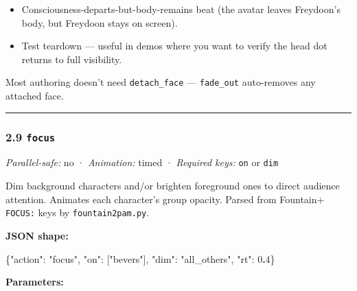 \documentclass[
  12pt,
  letterpaper,
]{book}
\newenvironment{Shaded}{}{}
\newcommand{\DataTypeTok}[1]{\textcolor[rgb]{0.56,0.13,0.00}{#1}}
\newcommand{\DecValTok}[1]{\textcolor[rgb]{0.25,0.63,0.44}{#1}}
\newcommand{\ErrorTok}[1]{\textcolor[rgb]{1.00,0.00,0.00}{\textbf{#1}}}
\newcommand{\FunctionTok}[1]{\textcolor[rgb]{0.02,0.16,0.49}{#1}}
\newcommand{\OtherTok}[1]{\textcolor[rgb]{0.00,0.44,0.13}{#1}}
\newcommand{\StringTok}[1]{\textcolor[rgb]{0.25,0.44,0.63}{#1}}
\providecommand{\tightlist}{%
  \setlength{\itemsep}{0pt}\setlength{\parskip}{0pt}}
\begin{document}
\begin{itemize}
\tightlist
\item
  Consciousness-departs-but-body-remains beat (the avatar leaves
  Freydoon's body, but Freydoon stays on screen).
\item
  Test teardown --- useful in demos where you want to verify the head
  dot returns to full visibility.
\end{itemize}

Most authoring doesn't need \texttt{detach\_face} --- \texttt{fade\_out}
auto-removes any attached face.

\begin{center}\rule{0.5\linewidth}{0.5pt}\end{center}

\subsubsection{\texorpdfstring{2.9
\texttt{focus}}{2.9 focus}}\label{focus}

\emph{Parallel-safe:} no · \emph{Animation:} timed · \emph{Required
keys:} \texttt{on} or \texttt{dim}

Dim background characters and/or brighten foreground ones to direct
audience attention. Animates each character's group opacity. Parsed from
Fountain+ \texttt{FOCUS:} keys by \texttt{fountain2pam.py}.

\textbf{JSON shape:}

\begin{Shaded}
\begin{Highlighting}[]
\FunctionTok{\{}\DataTypeTok{"action"}\FunctionTok{:} \StringTok{"focus"}\FunctionTok{,} \DataTypeTok{"on"}\FunctionTok{:} \OtherTok{[}\StringTok{"bevers"}\OtherTok{]}\FunctionTok{,} \DataTypeTok{"dim"}\FunctionTok{:} \StringTok{"all\_others"}\FunctionTok{,} \DataTypeTok{"rt"}\FunctionTok{:} \DecValTok{0}\ErrorTok{.}\DecValTok{4}\FunctionTok{\}}
\end{Highlighting}
\end{Shaded}

\textbf{Parameters:}
\end{document}
